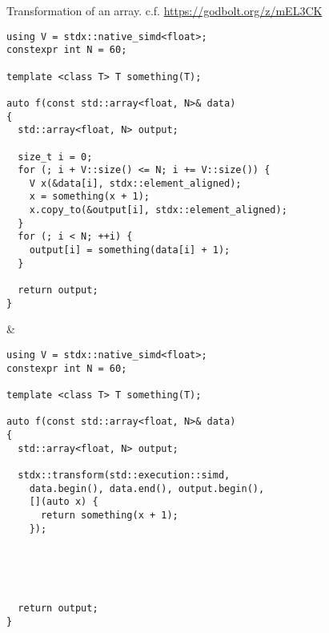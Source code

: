\begin{tonytable}{Transformation of an array. c.f. \url{https://godbolt.org/z/mEL3CK}}
  \smaller\begin{lstlisting}[linewidth=.45\textwidth]
using V = stdx::native_simd<float>;
constexpr int N = 60;

template <class T> T something(T);

auto f(const std::array<float, N>& data)
{
  std::array<float, N> output;

  size_t i = 0;
  for (; i + V::size() <= N; i += V::size()) {
    V x(&data[i], stdx::element_aligned);
    x = something(x + 1);
    x.copy_to(&output[i], stdx::element_aligned);
  }
  for (; i < N; ++i) {
    output[i] = something(data[i] + 1);
  }

  return output;
}
  \end{lstlisting}
  &
  \smaller\begin{lstlisting}[linewidth=.45\textwidth]
using V = stdx::native_simd<float>;
constexpr int N = 60;

template <class T> T something(T);

auto f(const std::array<float, N>& data)
{
  std::array<float, N> output;

  stdx::transform(std::execution::simd,
    data.begin(), data.end(), output.begin(),
    [](auto x) {
      return something(x + 1);
    });





  return output;
}
  \end{lstlisting}
\end{tonytable}

